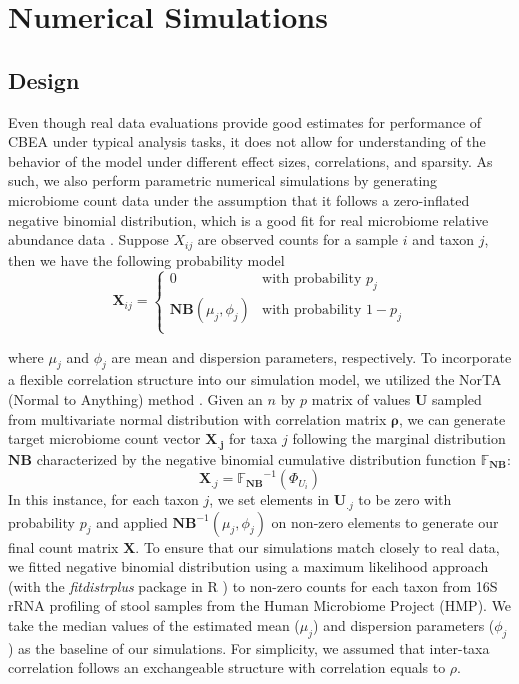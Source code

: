 \documentclass{article}
\begin{document}
\section{Numerical Simulations}
\subsection{Design}
Even though real data evaluations provide good estimates for performance of CBEA under typical analysis tasks, it does not allow for understanding of the behavior of the model under different effect sizes, correlations, and sparsity. As such, we also perform parametric numerical simulations by generating microbiome count data under the assumption that it follows a zero-inflated negative binomial distribution, which is a good fit for real microbiome relative abundance data \cite{calgaro2020}. Suppose $X_{ij}$ are observed counts for a sample $i$ and taxon $j$, then we have the following probability model
\begin{equation}
    \mathbf{X}_{ij} =
      \begin{cases}
        0 & \text{with probability $p_j$}\\
        \mathbf{NB}(\mu_j, \phi_j) & \text{with probability $1 - p_j$}\\
      \end{cases}       
\end{equation}

where $\mu_j$ and $\phi_j$ are mean and dispersion parameters, respectively. To incorporate a flexible correlation structure into our simulation model, we utilized the NorTA (Normal to Anything) method \cite{cario1997}. Given an $n$ by $p$ matrix of values $\mathbf{U}$ sampled from multivariate normal distribution with correlation matrix $\mathbf{\rho}$, we can generate target microbiome count vector $\mathbf{X_{.j}}$ for taxa $j$ following the marginal distribution $\mathbf{NB}$ characterized by the negative binomial cumulative distribution function $\mathbb{F_{\mathbf{NB}}}$:
\begin{equation}
    \mathbf{X}_{.j} = \mathbb{F_{\mathbf{NB}}}^{-1}(\Phi_{U_i})
\end{equation}
In this instance, for each taxon $j$, we set elements in $\mathbf{U}_{.j}$ to be zero with probability $p_j$ and applied $\mathbf{NB}^{-1}(\mu_j, \phi_j)$ on non-zero elements to generate our final count matrix $\mathbf{X}$. To ensure that our simulations match closely to real data, we fitted negative binomial distribution using a maximum likelihood approach (with the \emph{fitdistrplus} package in R \cite{delignette-muller2015}) to non-zero counts for each taxon from 16S rRNA profiling of stool samples from the Human Microbiome Project (HMP). We take the median values of the estimated mean ($\mu_j$) and dispersion parameters ($\phi_j$) as the baseline of our simulations. For simplicity, we assumed that inter-taxa correlation follows an exchangeable structure with correlation equals to $\rho$. 
\end{document}
